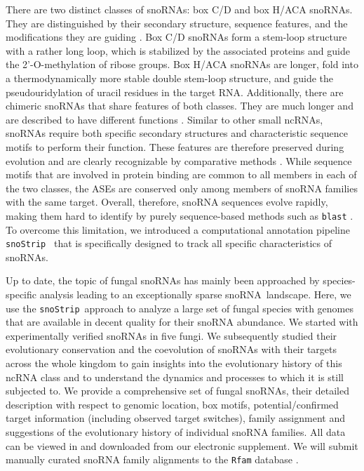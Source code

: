 \documentclass[preprint,3p,times]{elsarticle}
\newcommand{\NEW}[1]{\begingroup\color{black}#1\endgroup}
\newcommand{\sno}{snoRNA}
\newcommand{\snostrip}{\texttt{snoStrip}}
\begin{document}
There are two distinct classes of snoRNAs: box C/D and box H/ACA
snoRNAs.  They are distinguished by their secondary structure,
sequence features, and the modifications they are guiding
\cite{Balakin:1996,Tollervey:1997}.  Box C/D snoRNAs form a stem-loop
structure with a rather long loop, which is stabilized by the
associated proteins and guide the 2'-O-methylation of ribose groups.
Box H/ACA snoRNAs are longer, fold into a thermodynamically more
stable double stem-loop structure, and guide the pseudouridylation of
uracil residues in the target RNA.  Additionally, there are chimeric
snoRNAs that share features of both classes. They are much longer and
are described to have different functions \cite{Darzacq:2002}. Similar
to other small ncRNAs, snoRNAs require both specific secondary
structures and characteristic sequence motifs to perform their
function. These features are therefore preserved during evolution and
are clearly recognizable by comparative methods
\cite{Ganot:1997,Tollervey:1997}. While sequence motifs that are involved in
protein binding are common to all members in each of the two classes,
the ASEs are conserved only among members of snoRNA families with the
same target. Overall, therefore, snoRNA sequences evolve rapidly,
making them hard to identify by purely sequence-based methods such as
\texttt{blast} \cite{Altschul:1990}. To overcome this limitation, we
introduced a computational annotation pipeline \snostrip\
\cite{Bartschat:2014} that is specifically designed to track all
specific characteristics of snoRNAs.

\NEW{Up to date, the topic of fungal \sno s has mainly been approached
  by species-specific analysis leading to an exceptionally sparse
  \sno\ landscape. } Here, we use the \snostrip\ approach to analyze a
large set of fungal species with genomes that are available in decent
quality for their snoRNA abundance.  We started with experimentally
verified snoRNAs in five fungi.  We subsequently studied their
evolutionary conservation and the coevolution of snoRNAs with their
targets \NEW{across the whole kingdom to gain insights into the
  evolutionary history of this ncRNA class and to understand the
  dynamics and processes to which it is still subjected to.} We
provide a comprehensive set of fungal snoRNAs, their detailed
description with respect to genomic location, box motifs,
potential/confirmed target information (including observed target
switches), family assignment and suggestions of the evolutionary
history of individual snoRNA families.  All data can be viewed in and
downloaded from our electronic supplement. We will submit manually curated snoRNA
family alignments to the \texttt{Rfam} database
\cite{Nawrocki:2015}.
\end{document}
